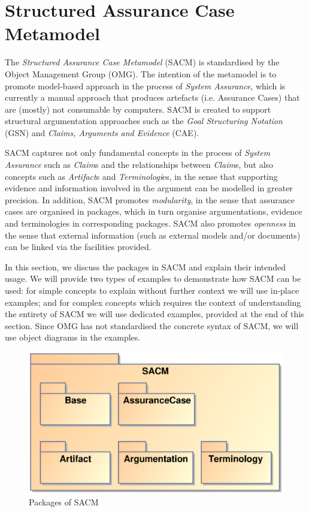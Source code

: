 \section{Structured Assurance Case Metamodel}
\label{sec:sacm}
The \textit{Structured Assurance Case Metamodel} (SACM) is standardised by the Object Management Group (OMG). 
The intention of the metamodel is to promote model-based approach in the process of \textit{System Assurance}, which is currently a manual approach that produces artefacts (i.e. Assurance Cases) that are (mostly) not consumable by computers. 
SACM is created to support structural argumentation approaches such as the \textit{Goal Structuring Notation} (GSN) and \textit{Claims, Arguments and Evidence} (CAE). 

SACM captures not only fundamental concepts in the process of \textit{System Assurance} such as \textit{Claim}s and the relationships between \textit{Claim}s, but also concepts such as \textit{Artifact}s and \textit{Terminologi}es, in the sense that supporting evidence and information involved in the argument can be modelled in greater precision. 
In addition, SACM promotes \textit{modularity}, in the sense that assurance cases are organised in packages, which in turn organise argumentations, evidence and terminologies in corresponding packages. 
SACM also promotes \textit{openness} in the sense that external information (such as external models and/or documents) can be linked via the facilities provided. 

In this section, we discuss the packages in SACM and explain their intended usage. 
We will provide two types of examples to demonstrate how SACM can be used: for simple concepts to explain without further context we will use in-place examples; and for complex concepts which requires the context of understanding the entirety of SACM we will use dedicated examples, provided at the end of this section.
Since OMG has not standardised the concrete syntax of SACM, we will use object diagrams in the examples. 

\begin{figure}
	\centering
	\includegraphics[width=0.6\linewidth]{Overview.eps}
	\caption{Packages of SACM}
	\label{fig:overview}
\end{figure}

